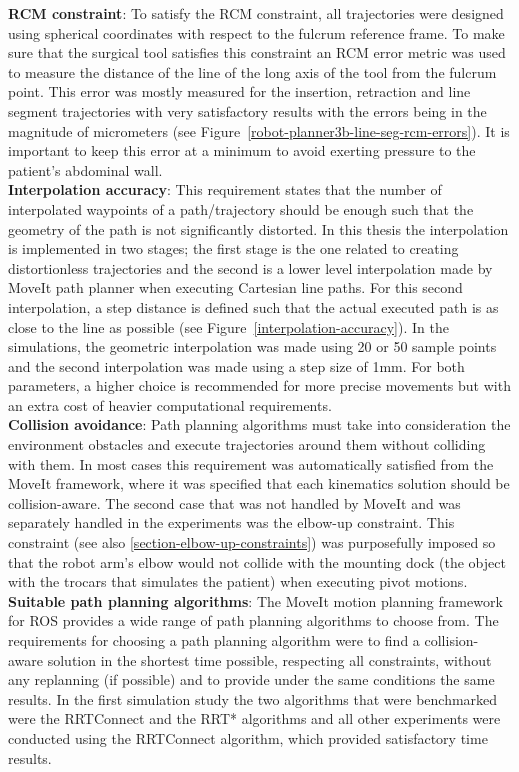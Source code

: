 \textbf{RCM constraint}: To satisfy the RCM constraint, all trajectories were designed using spherical coordinates with respect to the fulcrum reference frame. To make sure that the surgical tool satisfies this constraint an RCM error metric was used to measure the distance of the line of the long axis of the tool from the fulcrum point. This error was mostly measured for the insertion, retraction and line segment trajectories with very satisfactory results with the errors being in the magnitude of micrometers 
(see Figure~\ref{robot-planner3b-line-seg-rcm-errors}). It is important to keep this error at a minimum to avoid exerting pressure to the patient’s abdominal wall.\\

\textbf{Interpolation accuracy}: This requirement states that the number of interpolated waypoints of a path/trajectory should be enough such that the geometry of the path is not significantly distorted. In this thesis the interpolation is implemented in two stages; the first stage is the one related to creating distortionless trajectories and the second is a lower level interpolation made by MoveIt path planner when executing Cartesian line paths. For this second interpolation, a step distance is defined such that the actual executed path is as close to the line as possible (see Figure~\ref{interpolation-accuracy}). In the simulations, the geometric interpolation was made using 20 or 50 sample points and the second interpolation was made using a step size of 1mm. For both parameters, a higher choice is recommended for more precise movements but with an extra cost of heavier computational requirements.\\

\textbf{Collision avoidance}: Path planning algorithms must take into consideration the environment obstacles and execute trajectories around them without colliding with them. In most cases this requirement was automatically satisfied from the MoveIt framework, where it was specified that each kinematics solution should be collision-aware. The second case that was not handled by MoveIt and was separately handled in the experiments was the elbow-up constraint. This constraint (see also \ref{section-elbow-up-constraints}) was purposefully imposed so that the robot arm’s elbow would not collide with the mounting dock (the object with the trocars that simulates the patient) when executing pivot motions.\\

\textbf{Suitable path planning algorithms}: The MoveIt motion planning framework for ROS provides a wide range of path planning algorithms to choose from. The requirements for choosing a path planning algorithm were to find a collision-aware solution in the shortest time possible, respecting all constraints, without any replanning (if possible) and to provide under the same conditions the same results. In the first simulation study the two algorithms that were benchmarked were the RRTConnect and the RRT* algorithms and all other experiments were conducted using the RRTConnect algorithm, which provided satisfactory time results.\\

